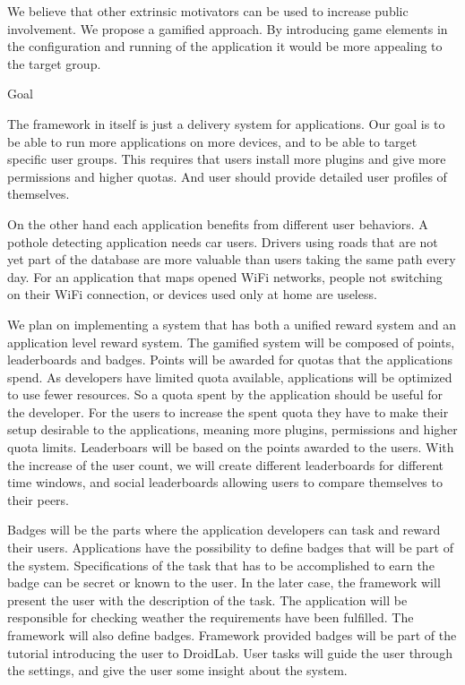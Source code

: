 \documentclass[conference,letterpaper]{IEEEtran}
\begin{document}
We believe that other extrinsic motivators can be used to increase public involvement. We propose a gamified approach. By introducing game elements in the configuration and running of the application it would be more appealing to the target group.

Goal

The framework in itself is just a delivery system for applications. Our goal is to be able to run more applications on more devices, and to be able to target specific user groups. This requires that users install more plugins and give more permissions and higher quotas. And user should provide detailed user profiles of themselves.

On the other hand each application benefits from different user behaviors. A pothole detecting application needs car users. Drivers using roads that are not yet part of the database are more valuable than users taking the same path every day. For an application that maps opened WiFi networks, people not switching on their WiFi connection, or devices used only at home are useless.


We plan on implementing a system that has both a unified reward system and an application level reward system. The gamified system will be composed of points, leaderboards and badges. Points will be awarded for quotas that the applications spend. As developers have limited quota available, applications will be optimized to use fewer resources. So a quota spent by the application should be useful for the developer. For the users to increase the spent quota they have to make their setup desirable to the applications, meaning more plugins, permissions and higher quota limits. Leaderboars will be based on the points awarded to the users. With the increase of the user count, we will create different leaderboards for different time windows, and social leaderboards allowing users to compare themselves to their peers.

Badges will be the parts where the application developers can task and reward their users. Applications have the possibility to define badges that will be part of the system. Specifications of the task that has to be accomplished to earn the badge can be secret or known to the user. In the later case, the framework will present the user with the description of the task. The application will be responsible for checking weather the requirements have been fulfilled. The framework will also define badges. Framework provided badges will be part of the tutorial introducing the user to DroidLab. User tasks will guide the user through the settings, and give the user some insight about the system.
\end{document}
